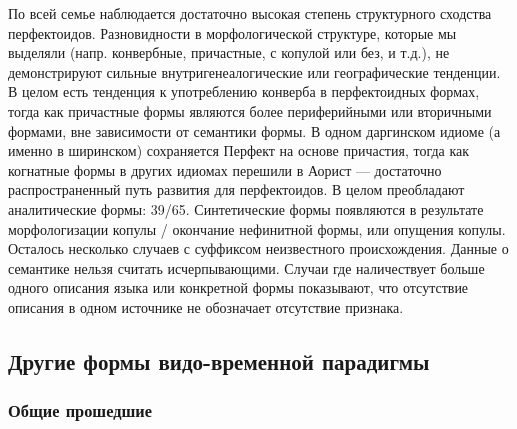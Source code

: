 По всей семье наблюдается достаточно высокая степень структурного сходства перфектоидов. Разновидности в морфологической структуре, которые мы выделяли (напр. конвербные, причастные, с копулой или без, и т.д.), не демонстрируют сильные внутригенеалогические или географические тенденции. В целом есть тенденция к употреблению конверба в перфектоидных формах, тогда как причастные формы являются более периферийными или вторичными формами, вне зависимости от семантики формы. В одном даргинском идиоме (а именно в ширинском) сохраняется Перфект на основе причастия, тогда как когнатные формы в других идиомах перешили в Аорист --- достаточно распространенный путь развития для перфектоидов. В целом преобладают аналитические формы: 39/65. Синтетические формы появляются в результате морфологизации копулы / окончание нефинитной формы, или опущения копулы. Осталось несколько случаев с суффиксом неизвестного происхождения. Данные о семантике нельзя считать исчерпывающими. Случаи где наличествует больше одного описания языка или конкретной формы показывают, что отсутствие описания в одном источнике не обозначает отсутствие признака. 


\subsection{Другие формы видо-временной парадигмы} \label{sec:otherf}

\subsubsection{Общие прошедшие} \label{sec:direct}

